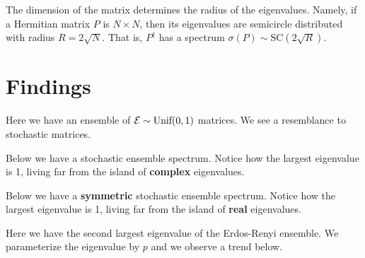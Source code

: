 \begin{remark}
The dimension of the matrix determines the radius of the eigenvalues. Namely, if a Hermitian matrix $P$ is $N \times N$, then its eigenvalues are semicircle distributed with radius $R = 2\sqrt{N}$. That is, $P^{\dagger}$ has a spectrum $\sigma({P}) \sim \text{SC}(2\sqrt{R})$.
\end{remark}


\newpage
\section{Findings}

Here we have an ensemble of $\mathcal{E} \sim \text{Unif}(0,1)$ matrices. We see a resemblance to
stochastic matrices.

\newpage

Below we have a stochastic ensemble spectrum. Notice how the largest eigenvalue is 1, living far from the island of \textbf{complex} eigenvalues.

\newpage

Below we have a \textbf{symmetric} stochastic ensemble spectrum. Notice how the largest eigenvalue is 1, living far from the island of \textbf{real} eigenvalues.

\newpage

Here we have the second largest eigenvalue of the Erdos-Renyi ensemble. We parameterize the eigenvalue by $p$ and we observe a trend below.


